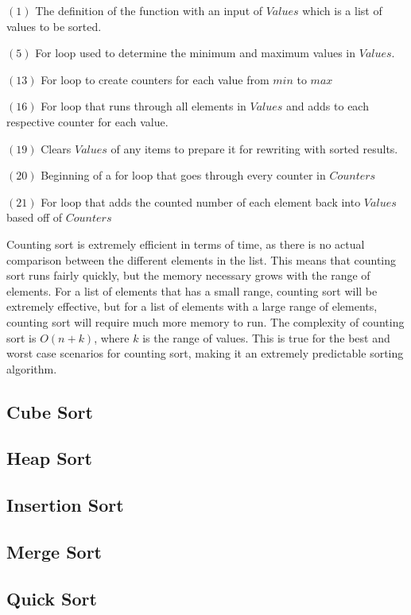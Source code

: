 \documentclass{article}
\begin{document}
\begin{multicols}{2}
$(1)$ The definition of the function with an input of $Values$ which is a list of values to be sorted.

$(5)$ For loop used to determine the minimum and maximum values in $Values$.

$(13)$ For loop to create counters for each value from $min$ to $max$

$(16)$ For loop that runs through all elements in $Values$ and adds to each respective counter for each value.

$(19)$ Clears $Values$ of any items to prepare it for rewriting with sorted results.

$(20)$ Beginning of a for loop that goes through every counter in $Counters$

$(21)$ For loop that adds the counted number of each element back into $Values$ based off of $Counters$
\end{multicols}
\begin{multicols}{2}
Counting sort is extremely efficient in terms of time, as there is no actual comparison between the different elements in the list. This means that counting sort runs fairly quickly, but the memory necessary grows with the range of elements. For a list of elements that has a small range, counting sort will be extremely effective, but for a list of elements with a large range of elements, counting sort will require much more memory to run. The complexity of counting sort is $O(n+k)$, where $k$ is the range of values. This is true for the best and worst case scenarios for counting sort, making it an extremely predictable sorting algorithm.
\end{multicols}
\subsection{Cube Sort}
\subsection{Heap Sort}
\subsection{Insertion Sort}
\subsection{Merge Sort}
\subsection{Quick Sort}
\end{document}
